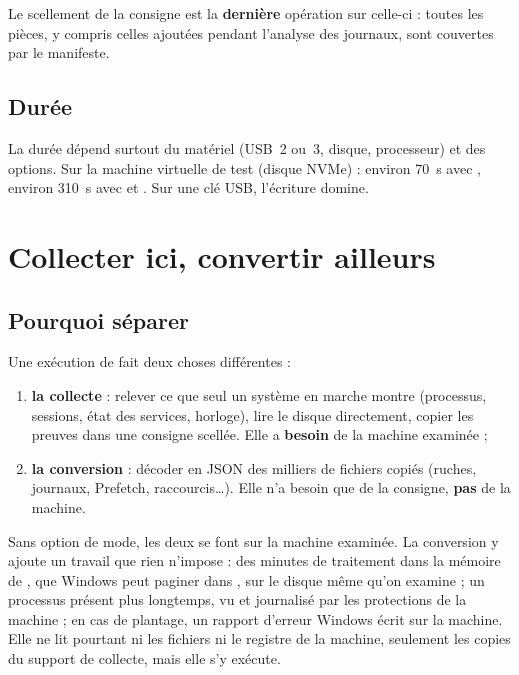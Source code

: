 \documentclass[11pt,a4paper,oneside]{report}
\begin{document}
Le scellement de la consigne est la \textbf{dernière} opération sur celle-ci :
toutes les pièces, y compris celles ajoutées pendant l'analyse des journaux, sont
couvertes par le manifeste.

\section{Durée}

La durée dépend surtout du matériel (USB~2 ou~3, disque, processeur) et des
options. Sur la machine virtuelle de test (disque NVMe) : environ 70~s avec
, environ 310~s avec  et . Sur une clé USB,
l'écriture domine.

\chapter{Collecter ici, convertir ailleurs}\label{chap:separation}

\section{Pourquoi séparer}

Une exécution de \wac{} fait deux choses différentes :
\begin{enumerate}
  \item \textbf{la collecte} : relever ce que seul un système en marche montre
        (processus, sessions, état des services, horloge), lire le disque
        directement, copier les preuves dans une consigne scellée. Elle a
        \textbf{besoin} de la machine examinée ;
  \item \textbf{la conversion} : décoder en JSON des milliers de fichiers
        copiés (ruches, journaux, Prefetch, raccourcis\ldots). Elle n'a besoin
        que de la consigne, \textbf{pas} de la machine.
\end{enumerate}

Sans option de mode, les deux se font sur la machine examinée. La conversion y
ajoute un travail que rien n'impose : des minutes de traitement dans la mémoire
de \wac{}, que Windows peut paginer dans , sur le disque
même qu'on examine ; un processus présent plus longtemps, vu et journalisé par
les protections de la machine ; en cas de plantage, un rapport d'erreur Windows
écrit sur la machine. Elle ne lit pourtant ni les fichiers ni le registre de la
machine, seulement les copies du support de collecte, mais elle s'y exécute.
\end{document}
